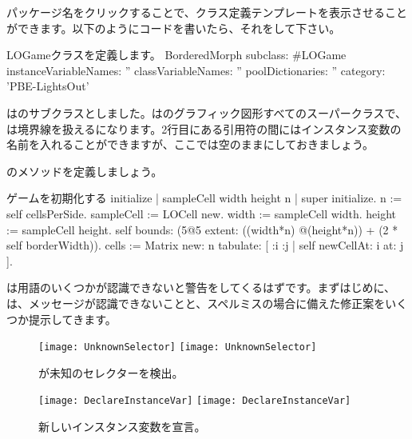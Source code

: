 \documentclass[a4paper,10pt,twoside]{book}
\begin{document}
パッケージ名をクリックすることで、クラス定義テンプレートを表示させることができます。以下のようにコードを書いたら、それをして下さい。

\begin{classdef}[sbegame]{LOGameクラスを定義します。}
BorderedMorph subclass: #LOGame
   instanceVariableNames: ''
   classVariableNames: ''
   poolDictionaries: ''
   category: 'PBE-LightsOut'
\end{classdef}

はのサブクラスとしました。は\pharo のグラフィック図形すべてのスーパークラスで、は境界線を扱えるになります。2行目にある引用符の間にはインスタンス変数の名前を入れることができますが、ここでは空のままにしておきましょう。

のメソッドを定義しましょう。


\begin{numMethod}[sbegameinitialize]{ゲームを初期化する}
initialize
   | sampleCell width height n |
   super initialize.
   n := self cellsPerSide.
   sampleCell := LOCell new.
   width := sampleCell width.
   height := sampleCell height.
   self bounds: (5@5 extent: ((width*n) @(height*n)) + (2 * self borderWidth)).
   cells := Matrix new: n tabulate: [ :i :j | self newCellAt: i at: j ].
\end{numMethod}


\pharo は用語のいくつかが認識できないと警告をしてくるはずです。まずはじめに、\pharo は、メッセージが認識できないことと、スペルミスの場合に備えた修正案をいくつか提示してきます。

\begin{figure}[htb]
\begin{minipage}{0.48\textwidth}
	\centering
	\ifluluelse
		{\texttt{[image: UnknownSelector]}}
		{\texttt{[image: UnknownSelector]}}
	\caption{\pharo が未知のセレクターを検出。}
\end{minipage}
\hfill
\begin{minipage}{0.48\textwidth}
	\centering
	\ifluluelse
		{\texttt{[image: DeclareInstanceVar]}}
		{\texttt{[image: DeclareInstanceVar]}}
	\caption{新しいインスタンス変数を宣言。}
\end{minipage}
\end{figure}
\end{document}
